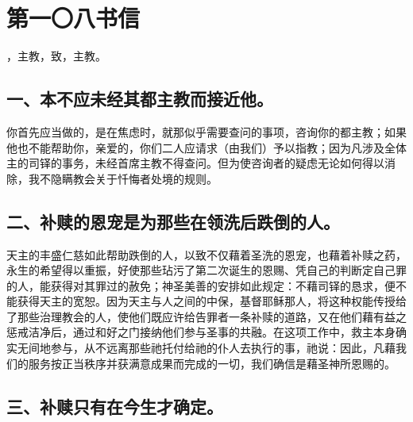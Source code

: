 
\section{第一〇八书信}

，主教，致，主教。\par


\subsection{一、本不应未经其都主教而接近他。}

你首先应当做的，是在焦虑时，就那似乎需要查问的事项，咨询你的都主教；如果他也不能帮助你，亲爱的，你们二人应请求（由我们）予以指教；因为凡涉及全体主的司铎的事务，未经首席主教不得查问。但为使咨询者的疑虑无论如何得以消除，我不隐瞒教会关于忏悔者处境的规则。\par


\subsection{二、补赎的恩宠是为那些在领洗后跌倒的人。}

天主的丰盛仁慈如此帮助跌倒的人，以致不仅藉着圣洗的恩宠，也藉着补赎之药，永生的希望得以重振，好使那些玷污了第二次诞生的恩赐、凭自己的判断定自己罪的人，能获得对其罪过的赦免；神圣美善的安排如此规定：不藉司铎的恳求，便不能获得天主的宽恕。因为天主与人之间的中保，基督耶稣那人，将这种权能传授给了那些治理教会的人，使他们既应许给告罪者一条补赎的道路，又在他们藉有益之惩戒洁净后，通过和好之门接纳他们参与圣事的共融。在这项工作中，救主本身确实无间地参与，从不远离那些祂托付给祂的仆人去执行的事，祂说：因此，凡藉我们的服务按正当秩序并获满意成果而完成的一切，我们确信是藉圣神所恩赐的。\par


\subsection{三、补赎只有在今生才确定。}

